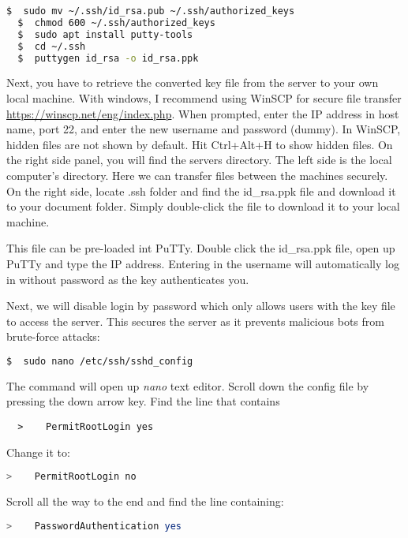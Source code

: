 \begin{lstlisting}[language=bash]
  $  sudo mv ~/.ssh/id_rsa.pub ~/.ssh/authorized_keys
  $  chmod 600 ~/.ssh/authorized_keys
  $  sudo apt install putty-tools
  $  cd ~/.ssh
  $  puttygen id_rsa -o id_rsa.ppk

\end{lstlisting}

Next, you have to retrieve the converted key file from the server to your own local machine. With windows, I recommend using WinSCP for secure file transfer \url{https://winscp.net/eng/index.php}. When prompted, enter the IP address in host name, port 22, and enter the new username and password (dummy). In WinSCP, hidden files are not shown by default. Hit Ctrl+Alt+H to show hidden files. On the right side panel, you will find the servers directory. The left side is the local computer's directory. Here we can transfer files between the machines securely. On the right side, locate .ssh folder and find the id\_rsa.ppk file and download it to your document folder. Simply double-click the file to download it to your local machine.

This file can be pre-loaded int PuTTy. Double click the id\_rsa.ppk file, open up PuTTy and type the IP address. Entering in the username will automatically log in without password as the key authenticates you.

Next, we will disable login by password which only allows users with the key file to access the server. This secures the server as it prevents malicious bots from brute-force attacks:

\begin{lstlisting}[language=bash]
  $  sudo nano /etc/ssh/sshd_config
\end{lstlisting}

The command will open up \emph{nano} text editor. Scroll down the config file by pressing the down arrow key. Find the line that contains

\begin{lstlisting}
  >    PermitRootLogin yes
\end{lstlisting}

Change it to:

\begin{lstlisting}[language=bash]
  >    PermitRootLogin no
\end{lstlisting}

Scroll all the way to the end and find the line containing:

\begin{lstlisting}[language=bash]
  >    PasswordAuthentication yes
\end{lstlisting}

